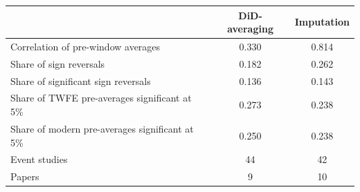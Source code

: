 \begin{tabular}{lcc}
\toprule
 & DiD-averaging & Imputation \\
\midrule
Correlation of pre-window averages & 0.330 & 0.814 \\
Share of sign reversals & 0.182 & 0.262 \\
Share of significant sign reversals & 0.136 & 0.143 \\
Share of TWFE pre-averages significant at 5\% & 0.273 & 0.238 \\
Share of modern pre-averages significant at 5\% & 0.250 & 0.238 \\
\midrule
Event studies & 44 & 42 \\
Papers & 9 & 10 \\
\bottomrule
\end{tabular}
